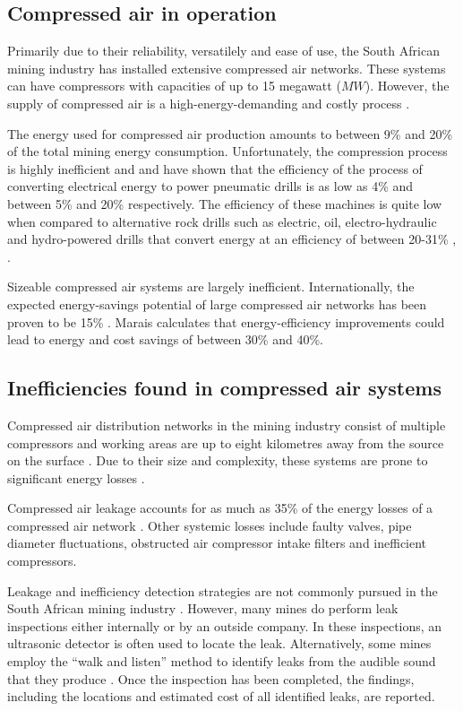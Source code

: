 	\subsection{Compressed air in operation}\label{key}
		Primarily due to their reliability, versatilely and ease of use, the South African mining industry has installed extensive compressed air networks. These systems can have compressors with capacities of up to 15 megawatt ($MW$)\cite{Marais2012PhD}. However, the supply of compressed air is a high-energy-demanding and costly process \cite{padachi2009energy}.
		\par 
		The energy used for compressed air production amounts to between 9\% and 20\% of the total mining energy consumption\footnotemark[1] \cite{du2011development}.  Unfortunately, the compression process is highly inefficient and \cite{fraser2008saving} and \cite{yang2009air} have shown that the efficiency of the process of converting electrical energy to power pneumatic drills is as low as 4\% and between 5\% and 20\%  respectively. The efficiency of these machines is quite low when compared to alternative rock drills such as electric, oil, electro-hydraulic and hydro-powered drills that convert energy at an efficiency of between 20-31\% \cite{fraser2008saving}, \cite{vanTonder2010Masters}. 
		\par
		Sizeable compressed air systems are largely inefficient. Internationally, the expected energy-savings potential of large compressed air networks has been proven to be 15\% \cite{neale2009compressed}. Marais \cite{marais2013simplification} calculates that energy-efficiency improvements could lead to energy and cost savings of between 30\% and 40\%. 
		
	\subsection{Inefficiencies found in compressed air systems}
		Compressed air distribution networks in the mining industry consist of multiple compressors and working areas are up to eight kilometres away from the source on the surface \cite{Marais2012PhD}. Due to their size and complexity, these systems are prone to significant energy losses \cite{Marais2012PhD}.
		\par 
		Compressed air leakage accounts for as much as 35\% of the energy losses of a compressed air network \cite{Lawrence2004Improving}. Other systemic losses include faulty valves, pipe diameter fluctuations, obstructed air compressor intake filters and inefficient compressors. 	
		\par
		Leakage and inefficiency detection strategies are not commonly pursued in the South African mining industry \cite{vanTonder2010Masters}. However, many mines do perform leak inspections either internally or by an outside company. In these inspections, an ultrasonic detector is often used to locate the leak. Alternatively, some mines employ the \enquote{walk and listen} method to identify leaks from the audible sound that they produce \cite{vanTonder2010Masters}. Once the inspection has been completed, the findings, including the locations and estimated cost of all identified leaks, are reported.
		
